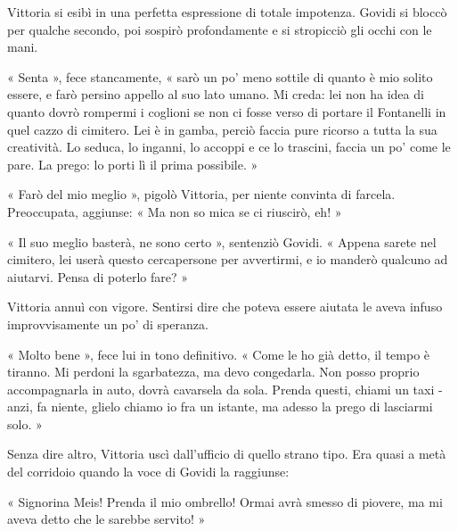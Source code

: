 Vittoria si esibì in una perfetta espressione di totale impotenza. Govidi si bloccò per qualche secondo, poi sospirò profondamente e si stropicciò gli occhi con le mani.

« Senta », fece stancamente, « sarò un po' meno sottile di quanto è mio solito essere, e farò persino appello al suo lato umano. Mi creda: lei non ha idea di quanto dovrò rompermi i coglioni se non ci fosse verso di portare il Fontanelli in quel cazzo di cimitero. Lei è in gamba, perciò faccia pure ricorso a tutta la sua creatività. Lo seduca, lo inganni, lo accoppi e ce lo trascini, faccia un po' come le pare. La prego: lo porti lì il prima possibile. »

« Farò del mio meglio », pigolò Vittoria, per niente convinta di farcela. Preoccupata, aggiunse: « Ma non so mica se ci riuscirò, eh! »

« Il suo meglio basterà, ne sono certo », sentenziò Govidi. « Appena sarete nel cimitero, lei userà questo cercapersone per avvertirmi, e io manderò qualcuno ad aiutarvi. Pensa di poterlo fare? »

Vittoria annuì con vigore. Sentirsi dire che poteva essere aiutata le aveva infuso improvvisamente un po' di speranza.

« Molto bene », fece lui in tono definitivo. « Come le ho già detto, il tempo è tiranno. Mi perdoni la sgarbatezza, ma devo congedarla. Non posso proprio accompagnarla in auto, dovrà cavarsela da sola. Prenda questi, chiami un taxi - anzi, fa niente, glielo chiamo io fra un istante, ma adesso la prego di lasciarmi solo. »

Senza dire altro, Vittoria uscì dall'ufficio di quello strano tipo. Era quasi a metà del corridoio quando la voce di Govidi la raggiunse:

« Signorina Meis! Prenda il mio ombrello! Ormai avrà smesso di piovere, ma mi aveva detto che le sarebbe servito! »